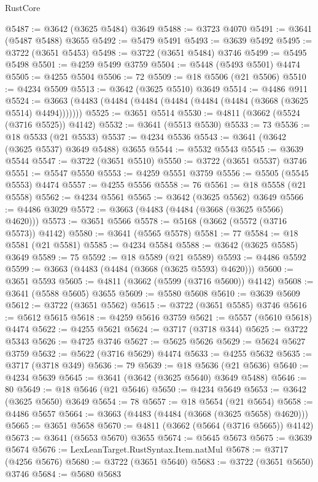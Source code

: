\begin{lexlean}{RustCore}
\begin{coremodule}
@5487 := @3642 (@3625 @5484) @3649
@5488 := @3723 @4070
@5491 := @3641 (@5487 @5488) @3655
@5492 := @5479 @5491
@5493 := @3639 @5492
@5495 := @3722 (@3651 @5453)
@5498 := @3722 (@3651 @5484) @3746
@5499 := @5495 @5498
@5501 := @4259 @5499 @3759
@5504 := @5448 (@5493 @5501) @4474
@5505 := @4255 @5504
@5506 := 72
@5509 := @18 @5506 (@21 @5506)
@5510 := @4234 @5509
@5513 := @3642 (@3625 @5510) @3649
@5514 := @4486 @911
@5524 := @3663 (@4483 (@4484 (@4484 (@4484 (@4484 (@4484 (@3668 (@3625 @5514) @4494)))))))
@5525 := @3651 @5514
@5530 := @4811 (@3662 (@5524 (@3716 @5525)) @4142)
@5532 := @3641 (@5513 @5530)
@5533 := 73
@5536 := @18 @5533 (@21 @5533)
@5537 := @4234 @5536
@5543 := @3641 (@3642 (@3625 @5537) @3649 @5488) @3655
@5544 := @5532 @5543
@5545 := @3639 @5544
@5547 := @3722 (@3651 @5510)
@5550 := @3722 (@3651 @5537) @3746
@5551 := @5547 @5550
@5553 := @4259 @5551 @3759
@5556 := @5505 (@5545 @5553) @4474
@5557 := @4255 @5556
@5558 := 76
@5561 := @18 @5558 (@21 @5558)
@5562 := @4234 @5561
@5565 := @3642 (@3625 @5562) @3649
@5566 := @4486 @3029
@5572 := @3663 (@4483 (@4484 (@3668 (@3625 @5566) @4620)))
@5573 := @3651 @5566
@5578 := @5168 (@3662 (@5572 (@3716 @5573)) @4142)
@5580 := @3641 (@5565 @5578)
@5581 := 77
@5584 := @18 @5581 (@21 @5581)
@5585 := @4234 @5584
@5588 := @3642 (@3625 @5585) @3649
@5589 := 75
@5592 := @18 @5589 (@21 @5589)
@5593 := @4486 @5592
@5599 := @3663 (@4483 (@4484 (@3668 (@3625 @5593) @4620)))
@5600 := @3651 @5593
@5605 := @4811 (@3662 (@5599 (@3716 @5600)) @4142)
@5608 := @3641 (@5588 @5605) @3655
@5609 := @5580 @5608
@5610 := @3639 @5609
@5612 := @3722 (@3651 @5562)
@5615 := @3722 (@3651 @5585) @3746
@5616 := @5612 @5615
@5618 := @4259 @5616 @3759
@5621 := @5557 (@5610 @5618) @4474
@5622 := @4255 @5621
@5624 := @3717 (@3718 @344)
@5625 := @3722 @5343
@5626 := @4725 @3746
@5627 := @5625 @5626
@5629 := @5624 @5627 @3759
@5632 := @5622 (@3716 @5629) @4474
@5633 := @4255 @5632
@5635 := @3717 (@3718 @349)
@5636 := 79
@5639 := @18 @5636 (@21 @5636)
@5640 := @4234 @5639
@5645 := @3641 (@3642 (@3625 @5640) @3649 @5488)
@5646 := 80
@5649 := @18 @5646 (@21 @5646)
@5650 := @4234 @5649
@5653 := @3642 (@3625 @5650) @3649
@5654 := 78
@5657 := @18 @5654 (@21 @5654)
@5658 := @4486 @5657
@5664 := @3663 (@4483 (@4484 (@3668 (@3625 @5658) @4620)))
@5665 := @3651 @5658
@5670 := @4811 (@3662 (@5664 (@3716 @5665)) @4142)
@5673 := @3641 (@5653 @5670) @3655
@5674 := @5645 @5673
@5675 := @3639 @5674
@5676 := LexLeanTarget.RustSyntax.Item.natMul
@5678 := @3717 (@4256 @5676)
@5680 := @3722 (@3651 @5640)
@5683 := @3722 (@3651 @5650) @3746
@5684 := @5680 @5683

\end{coremodule}
\end{lexlean}
